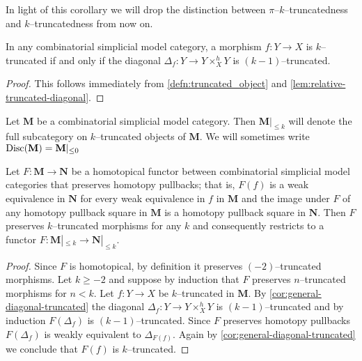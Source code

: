 In light of this corollary we will drop the distinction between \(\pi\)--\(k\)--truncatedness and \(k\)--truncated\-ness from now on.

\begin{corollary}\label{cor:general-diagonal-truncated}
  In any combinatorial simplicial model category, a morphism \(f\colon Y\to X\) is \(k\)--truncated if and only if the diagonal \(\Delta_{f}\colon Y\to Y\times^{h}_{X} Y\) is \((k-1)\)--truncated.
\end{corollary}
\begin{proof}
  This follows immediately from \autoref{defn:truncated_object} and \autoref{lem:relative-truncated-diagonal}.
\end{proof}

\begin{definition}
  Let \(\mathbf{M}\) be a combinatorial simplicial model category. Then \(\mathbf{M}|_{{\leq}k}\) will denote the full subcategory on \(k\)--truncated objects of \(\mathbf{M}\). We will sometimes write \(\operatorname{\textnormal{Disc}}(\mathbf M) = \mathbf{M}|_{\leq 0}\)
\end{definition}

\begin{proposition}\label{prop:truncated-objects-exact-functors}
  Let \(F\colon \mathbf{M}\to\mathbf{N}\) be a homotopical functor between combinatorial simplicial model categories that preserves homotopy pullbacks; that is, \(F(f)\) is a weak equivalence in \(\mathbf N\) for every weak equivalence in \(f\) in \(\mathbf M\) and the image under \(F\) of any homotopy pullback square in \(\mathbf M\) is a homotopy pullback square in \(\mathbf N\). Then \(F\) preserves \(k\)--truncated morphisms for any \(k\) and consequently restricts to a functor \(F\colon \mathbf M|_{\leq k}\to\mathbf N|_{\leq k}\).
\end{proposition}
\begin{proof}
  Since \(F\) is homotopical, by definition it preserves \((-2)\)--truncated morphisms. Let \(k\geq -2\) and suppose by induction that \(F\) preserves \(n\)--truncated morphisms for \(n<k\). Let \(f\colon Y\to X\) be \(k\)--truncated in \(\mathbf M\). By \autoref{cor:general-diagonal-truncated} the diagonal \(\Delta_{f}\colon Y\to Y\times^{h}_{X} Y\) is \((k-1)\)--truncated and by induction \(F(\Delta_{f})\) is \((k-1)\)--truncated. Since \(F\) preserves homotopy pullbacks \(F(\Delta_{f})\) is weakly equivalent to \(\Delta_{F(f)}\). Again by \autoref{cor:general-diagonal-truncated} we conclude that \(F(f)\) is \(k\)--truncated.
\end{proof}


